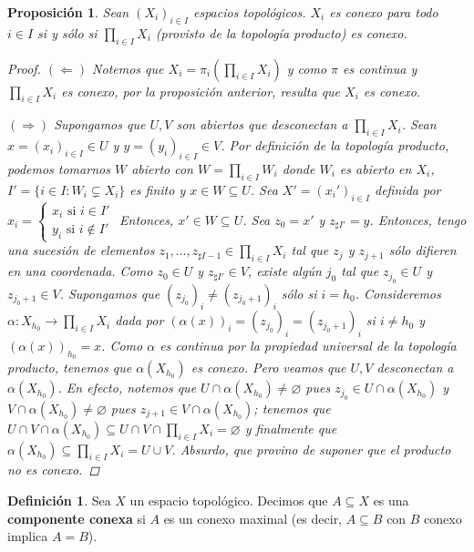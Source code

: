 \documentclass[12pt]{book}
\newtheorem{prop}[teo]{Proposición}
\theoremstyle{definition}
\newtheorem{defn}[teo]{Definición}
\let\emptyset\varnothing
\begin{document}
\begin{prop}
Sean $(X_i)_{i\in I}$ espacios topológicos. $X_i$ es conexo para todo $i\in I$ si y sólo si $\displaystyle\prod_{i\in I}X_i$ (provisto de la topología producto) es conexo.
\begin{proof}
$(\Longleftarrow)$ Notemos que $X_i = \pi_i\left(\displaystyle\prod_{i\in I}X_i\right)$ y como $\pi$ es continua y $\displaystyle\prod_{i\in I}X_i$ es conexo, por la proposición anterior, resulta que $X_i$ es conexo.

$(\Longrightarrow)$ Supongamos que $U,V$ son abiertos que desconectan a $\displaystyle\prod_{i\in I}X_i$. Sean $x=(x_i)_{i\in I}\in U$ y $y=(y_i)_{i\in I}\in V$. Por definición de la topología producto, podemos tomarnos $W$ abierto con $W=\displaystyle\prod_{i\in I} W_i$ donde $W_i$ es abierto en $X_i$, $I' = \{i\in I : W_i \subsetneq X_i\}$ es finito y $x\in W\subseteq U$. Sea $X' = (x_i')_{i\in I}$ definida por $x_i = \begin{cases} x_i \text{ si }i\in I' \\ y_i \text{ si }i\notin I' \end{cases}$ Entonces, $x'\in W\subseteq U$. Sea $z_0=x'$ y $z_{\sharp I'} = y$. Entonces, tengo una sucesión de elementos $z_1,\ldots , z_{\sharp I - 1}\in\displaystyle\prod_{i\in I}X_i$ tal que $z_j$ y $z_{j+1}$ sólo difieren en una coordenada. Como $z_0\in U$ y $z_{\sharp I'}\in V$, existe algún $j_0$ tal que $z_{j_0}\in U$ y $z_{j_0 + 1}\in V$. Supongamos que $(z_{j_0})_i \neq (z_{j_0 + 1})_i$ sólo si $i=h_0$. Consideremos $\alpha:X_{h_0}\to\displaystyle\prod_{i\in I} X_i$ dada por $(\alpha(x))_{i} = (z_{j_0})_i = (z_{j_0 + 1})_{i}$ si $i\neq h_0$ y $(\alpha(x))_{h_0} = x$. Como $\alpha$ es continua por la propiedad universal de la topología producto, tenemos que $\alpha(X_{h_0})$ es conexo. Pero veamos que $U,V$ desconectan a $\alpha(X_{h_0})$. En efecto, notemos que $U\cap \alpha(X_{h_0})\neq \emptyset$ pues $z_{j_0}\in U\cap \alpha(X_{h_0})$ y $V\cap\alpha(X_{h_0})\neq\emptyset$ pues $z_{j+1}\in V\cap \alpha(X_{h_0})$; tenemos que $U\cap V\cap \alpha(X_{h_0})\subseteq U\cap V\cap \displaystyle\prod_{i\in I}X_i = \emptyset$ y finalmente que $\alpha(X_{h_0})\subseteq \displaystyle\prod_{i\in I}X_i = U\cup V$. Absurdo, que provino de suponer que el producto no es conexo.
\end{proof}
\end{prop}

\begin{defn}
Sea $X$ un espacio topológico. Decimos que $A\subseteq X$ es una \textbf{componente conexa} si $A$ es un conexo maximal (es decir, $A\subseteq B$ con $B$ conexo implica $A=B$).
\end{defn}
\end{document}
